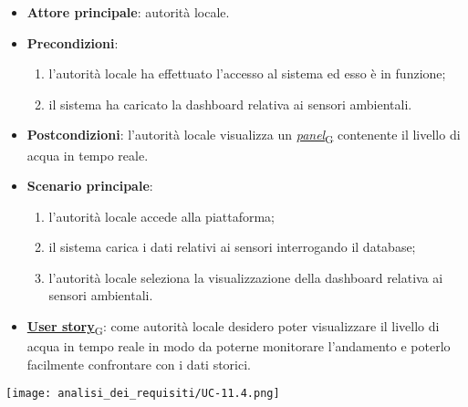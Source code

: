 \begin{itemize}
	\item \textbf{Attore principale}: autorità locale.
	\item \textbf{Precondizioni}:
	      \begin{enumerate}
		      \item l'autorità locale ha effettuato l'accesso al sistema ed esso è in funzione;
		      \item il sistema ha caricato la dashboard relativa ai sensori ambientali.
	      \end{enumerate}
	\item \textbf{Postcondizioni}: l'autorità locale visualizza un \href{https://7last.github.io/docs/rtb/documentazione-interna/glossario\#panel}{\textit{panel}\textsubscript{G}} contenente il livello di acqua in tempo reale.
	\item \textbf{Scenario principale}:
	      \begin{enumerate}
		      \item l'autorità locale accede alla piattaforma;
		      \item il sistema carica i dati relativi ai sensori interrogando il database;
		      \item l'autorità locale seleziona la visualizzazione della dashboard relativa ai sensori ambientali.
	      \end{enumerate}
	\item \href{https://7last.github.io/docs/rtb/documentazione-interna/glossario\#user-story}{\textbf{User story}\textsubscript{G}}:
	      come autorità locale desidero poter visualizzare il livello di acqua in tempo reale in modo da poterne monitorare l'andamento
	      e poterlo facilmente confrontare con i dati storici.
\end{itemize}
\begin{center}
	\texttt{[image: analisi\_dei\_requisiti/UC-11.4.png]}
\end{center}



